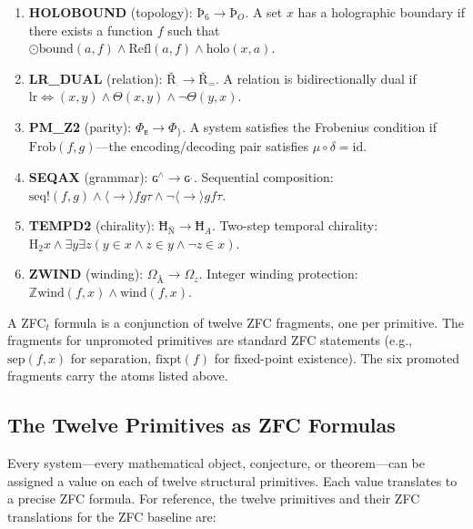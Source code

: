 \documentclass[12pt]{article}
\begin{document}
\begin{enumerate}
\item \textbf{HOLOBOUND} (topology): $\text{Þ}_6 \to \text{Þ}_O$.
      A set $x$ has a holographic boundary if there exists a function
      $f$ such that $\odot\text{bound}(a,f) \land \text{Refl}(a,f) \land
      \text{holo}(x,a)$.
\item \textbf{LR\_DUAL} (relation): $\text{Ř}_{\bar{}} \to \text{Ř}_=$.
      A relation is bidirectionally dual if
      $\text{lr}{\Leftrightarrow}(x,y) \land \Theta(x,y) \land \lnot\Theta(y,x)$.
\item \textbf{PM\_Z2} (parity): $\Phi_{\text{ɐ}} \to \Phi_{\text{\}}}$.
      A system satisfies the Frobenius condition if
      $\text{Frob}(f,g)$---the encoding/decoding pair satisfies $\mu\circ\delta=\text{id}$.
\item \textbf{SEQAX} (grammar): $\text{ɢ}^{\land} \to \text{ɢ}^{ˌ}$.
      Sequential composition:
      $\text{seq!}(f,g) \land \langle\to\rangle f g \tau \land
      \lnot\langle\to\rangle g f \tau$.
\item \textbf{TEMPD2} (chirality): $\text{Ħ}_\text{Ñ} \to \text{Ħ}_A$.
      Two-step temporal chirality:
      $\text{H}_2 x \land \exists y\exists z(y\in x \land z\in y \land \lnot z\in x)$.
\item \textbf{ZWIND} (winding): $\Omega_{\text{Å}} \to \Omega_z$.
      Integer winding protection:
      $\mathbb{Z}\text{wind}(f,x) \land \text{wind}(f,x)$.
\end{enumerate}

A ZFC${}_t$ formula is a conjunction of twelve ZFC fragments, one per
primitive. The fragments for unpromoted primitives are standard ZFC
statements (e.g., $\text{sep}(f,x)$ for separation, $\text{fixpt}(f)$
for fixed-point existence). The six promoted fragments carry the
atoms listed above.

\subsection{The Twelve Primitives as ZFC Formulas}

Every system---every mathematical object, conjecture, or theorem---can
be assigned a value on each of twelve structural primitives. Each value
translates to a precise ZFC formula. For reference, the twelve primitives
and their ZFC translations for the ZFC baseline are:
\end{document}
